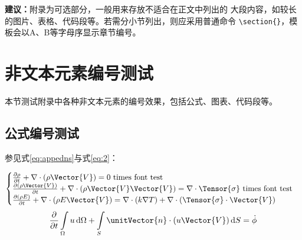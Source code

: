 \begin{appendices}\label{sec:appendices}

    \begin{leftbar}
        \noindent\textbf{建议：}附录为可选部分，一般用来存放不适合在正文中列出的
        大段内容，如较长的图片、表格、代码段等。若需分小节列出，则应采用普通命令
        \verb|\section{}|，模板会以A、B等字母序显示章节编号。
    \end{leftbar}

    \section{非文本元素编号测试} \label{sec:nontextelements}

    本节测试附录中各种非文本元素的编号效果，包括公式、图表、代码段等。

    \subsection{公式编号测试} \label{subsec:testmath}

    参见式\eqref{eq:appedns}与式\eqref{eq:2}：

    \begin{equation} \label{eq:appedns}
        \begin{cases}
            \frac{\partial \rho}{\partial t} + \nabla\cdot(\rho\Vector{V}) = 0 \ \mathrm{times\ font\ test}                                            \\
            \frac{\partial (\rho\Vector{V})}{\partial t} + \nabla\cdot(\rho\Vector{V}\Vector{V}) = \nabla\cdot\Tensor{\sigma} \ \text{times font test} \\
            \frac{\partial (\rho E)}{\partial t} + \nabla\cdot(\rho E\Vector{V}) = \nabla\cdot(k\nabla T) + \nabla\cdot(\Tensor{\sigma}\cdot\Vector{V})
        \end{cases}
    \end{equation}
    \begin{equation} \label{eq:2}
        \frac{\partial }{\partial t}\int\limits_{\Omega} u \, \mathrm{d}\Omega + \int\limits_{S} \unitVector{n}\cdot(u\Vector{V}) \, \mathrm{d}S = \dot{\phi}
    \end{equation}


\end{appendices}
